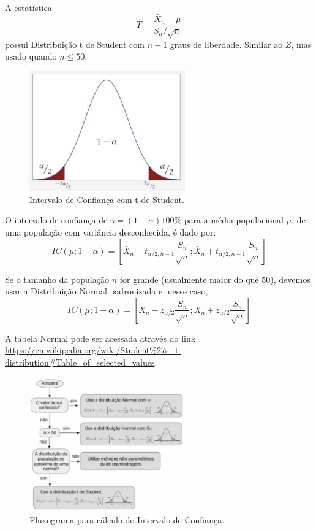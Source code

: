 \documentclass{article}
\begin{document}
A estatística
    $$
    T = \frac{\bar{X}_n - \mu}{S_n / \sqrt{n}}
    $$
possui Distribuição t de Student com $n - 1$ graus de liberdade. Similar ao $Z$, mas usado quando $n\leq50$.

\begin{figure}[H]
    \centering
    \includegraphics[width=0.6\textwidth]{figuras/intervalo_confianca_t_student.png}
    \caption{Intervalo de Confiança com t de Student.}
    \label{fig:intervalo_confianca_t_student}
\end{figure}

O intervalo de confiança de $\gamma = (1 - \alpha)100\%$ para a média populacional $\mu$, de uma população com variância desconhecida, é dado por:
    $$
    IC(\mu; 1 - \alpha) = 
    \left[
    \bar{X}_n - t_{\alpha/2, n-1}\frac{S_n}{\sqrt{n}}; 
    \bar{X}_n + t_{\alpha/2, n-1}\frac{S_n}{\sqrt{n}}
    \right]
    $$

Se o tamanho da população $n$ for grande (usualmente maior do que 50), devemos usar a Distribuição Normal padronizada e, nesse caso,
    $$
    IC(\mu; 1 - \alpha) = 
    \left[
    \bar{X}_n - z_{\alpha/2}\frac{S_n}{\sqrt{n}}; 
    \bar{X}_n + z_{\alpha/2}\frac{S_n}{\sqrt{n}}
    \right]
    $$

A tabela Normal pode ser acessada através do link \url{https://en.wikipedia.org/wiki/Student%27s_t-distribution#Table_of_selected_values}.

\begin{figure}[H]
    \centering
    \includegraphics[width=0.6\textwidth]{figuras/intervalo_confianca_fluxograma.png}
    \caption{Fluxograma para cálculo do Intervalo de Confiança.}
    \label{fig:intervalo_confianca_fluxograma}
\end{figure}
\end{document}
